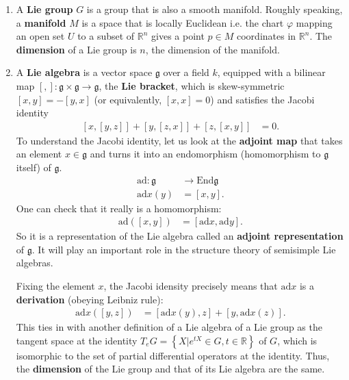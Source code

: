 \documentclass[aps,nofootinbib]{revtex4}
\begin{document}
\begin{enumerate}
\item A \textbf{Lie group} $G$ is a group that is also a smooth manifold.
Roughly speaking, a \textbf{manifold} $M$ is a space that is locally
Euclidean i.e. the chart $\varphi$ mapping an open set $U$ to a
subset of $\mathbb{R}^{n}$ gives a point $p\in M$ coordinates in
$\mathbb{R}^{n}$. The \textbf{dimension} of a Lie group is $n$,
the dimension of the manifold.

\item \label{Lie algebra} A \textbf{Lie algebra} is a vector space $\mathfrak{g}$ over a field $k$, equipped with a bilinear map $\left[,\right]:\mathfrak{g}\times\mathfrak{g}\to\mathfrak{g}$,
the \textbf{Lie bracket}, which is skew-symmetric $\left[x,y\right]=-\left[y,x\right]$
(or equivalently, $\left[x,x\right]=0$) and satisfies the Jacobi
identity
\begin{align*}
\left[x,\left[y,z\right]\right]+\left[y,\left[z,x\right]\right]+\left[z,\left[x,y\right]\right] & =0.
\end{align*}
To understand the Jacobi identity, let us look at the \textbf{adjoint
map} that takes an element $x\in\mathfrak{g}$ and turns it into an
endomorphism (homomorphism to $\mathfrak{g}$ itself) of $\mathfrak{g}$.
\begin{align*}
\mbox{ad}:\mathfrak{g} & \to\mbox{End}\mathfrak{g}\\
\mbox{ad}x\left(y\right) & =\left[x,y\right].
\end{align*}
One can check that it really is a homomorphism:
\begin{align*}
\mbox{ad}\left(\left[x,y\right]\right) & =\left[\mbox{ad}x,\mbox{ad}y\right].
\end{align*}
So it is a representation of the Lie algebra called an \textbf{adjoint
representation }of $\mathfrak{g}$. It will play an important
role in the structure theory of semisimple Lie algebras.

Fixing the element $x$, the Jacobi idensity precisely means that
$\mbox{ad}x$ is a \textbf{derivation} (obeying Leibniz rule):
\begin{align*}
\mbox{ad}x\left(\left[y,z\right]\right) & =\left[\mbox{ad}x\left(y\right),z\right]+\left[y,\mbox{ad}x\left(z\right)\right].
\end{align*}
This ties in with another definition of a Lie algebra of a Lie group
as the tangent space at the identity $T_{e}G=\left\{ X|e^{tX}\in G,t\in\mathbb{R}\right\} $
of $G$, which is isomorphic to the set of partial differential operators
at the identity. Thus, the \textbf{dimension }of the Lie group and
that of its Lie algebra are the same.


\end{enumerate}
\end{document}

